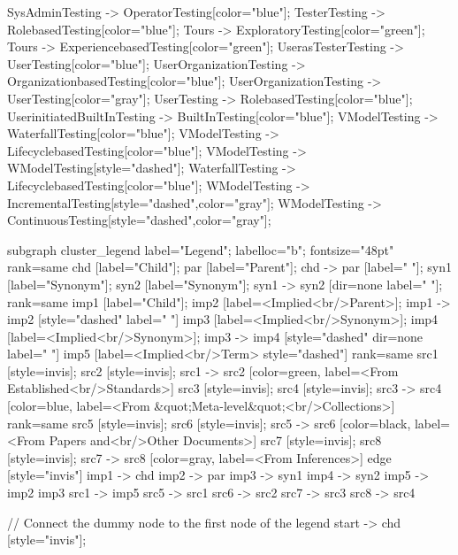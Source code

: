 \documentclass{article}
\begin{document}
{SysAdminTesting -> OperatorTesting[color="blue"];
TesterTesting -> RolebasedTesting[color="blue"];
Tours -> ExploratoryTesting[color="green"];
Tours -> ExperiencebasedTesting[color="green"];
UserasTesterTesting -> UserTesting[color="blue"];
UserOrganizationTesting -> OrganizationbasedTesting[color="blue"];
UserOrganizationTesting -> UserTesting[color="gray"];
UserTesting -> RolebasedTesting[color="blue"];
UserinitiatedBuiltInTesting -> BuiltInTesting[color="blue"];
VModelTesting -> WaterfallTesting[color="blue"];
VModelTesting -> LifecyclebasedTesting[color="blue"];
VModelTesting -> WModelTesting[style="dashed"];
WaterfallTesting -> LifecyclebasedTesting[color="blue"];
WModelTesting -> IncrementalTesting[style="dashed",color="gray"];
WModelTesting -> ContinuousTesting[style="dashed",color="gray"];

subgraph cluster_legend {
    label="Legend";
    labelloc="b";
    fontsize="48pt"
    {
        rank=same
        chd [label="Child"];
        par [label="Parent"];
        chd -> par [label="                "];
        syn1 [label="Synonym"];
        syn2 [label="Synonym"];
        syn1 -> syn2 [dir=none label="                "];
    }
    {
        rank=same
        imp1 [label="Child"];
        imp2 [label=<Implied<br/>Parent>];
        imp1 -> imp2 [style="dashed" label="                "]
        imp3 [label=<Implied<br/>Synonym>];
        imp4 [label=<Implied<br/>Synonym>];
        imp3 -> imp4 [style="dashed" dir=none label="                "]
    }
        imp5 [label=<Implied<br/>Term> style="dashed"]
{
rank=same
src1 [style=invis];
src2 [style=invis];
src1 -> src2 [color=green, label=<From Established<br/>Standards>]
src3 [style=invis];
src4 [style=invis];
src3 -> src4 [color=blue, label=<From &quot;Meta-level&quot;<br/>Collections>]
}
{
rank=same
src5 [style=invis];
src6 [style=invis];
src5 -> src6 [color=black, label=<From Papers and<br/>Other Documents>]
src7 [style=invis];
src8 [style=invis];
src7 -> src8 [color=gray, label=<From Inferences>]
}
    edge [style="invis"]
    imp1 -> chd
    imp2 -> par
    imp3 -> syn1
    imp4 -> syn2
imp5 -> { imp2 imp3 }
src1 -> imp5
src5 -> src1
src6 -> src2
src7 -> src3
src8 -> src4
}

// Connect the dummy node to the first node of the legend
start -> chd [style="invis"];
}
\end{document}
